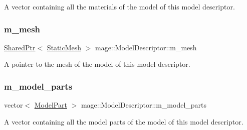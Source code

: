 A vector containing all the materials of the model of this model descriptor. \hypertarget{classmage_1_1_model_descriptor_ac3935d5b0738860809a770403ed07480}{}\label{classmage_1_1_model_descriptor_ac3935d5b0738860809a770403ed07480} 
\subsubsection{\texorpdfstring{m\+\_\+mesh}{m\_mesh}}
{\footnotesize\ttfamily \hyperlink{namespacemage_a1e01ae66713838a7a67d30e44c67703e}{Shared\+Ptr}$<$ \hyperlink{classmage_1_1_static_mesh}{Static\+Mesh} $>$ mage\+::\+Model\+Descriptor\+::m\+\_\+mesh\hspace{0.3cm}{\ttfamily [private]}}

A pointer to the mesh of the model of this model descriptor. \hypertarget{classmage_1_1_model_descriptor_a200c6e44c9b6a5bde5c8490fb93ba00f}{}\label{classmage_1_1_model_descriptor_a200c6e44c9b6a5bde5c8490fb93ba00f} 
\subsubsection{\texorpdfstring{m\+\_\+model\+\_\+parts}{m\_model\_parts}}
{\footnotesize\ttfamily vector$<$ \hyperlink{structmage_1_1_model_part}{Model\+Part} $>$ mage\+::\+Model\+Descriptor\+::m\+\_\+model\+\_\+parts\hspace{0.3cm}{\ttfamily [private]}}

A vector containing all the model parts of the model of this model descriptor. 